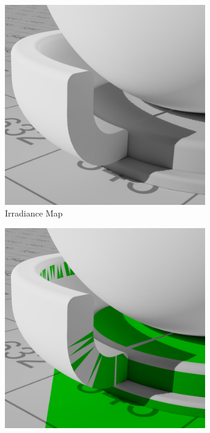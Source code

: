 	\begin{figure}[h]
		\begin{subfigure}[b]{0.5\textwidth}
			\center
			\includegraphics[width=0.95\textwidth]{pic/irrmap-shaderball2-irrmap.png}
			\caption{Irradiance Map}
		\end{subfigure}
		\begin{subfigure}[b]{0.5\textwidth}
			\center
			\includegraphics[width=0.95\textwidth]{pic/irrmap-shaderball2-irrmap-order.png}

\end{subfigure}
\end{figure}
